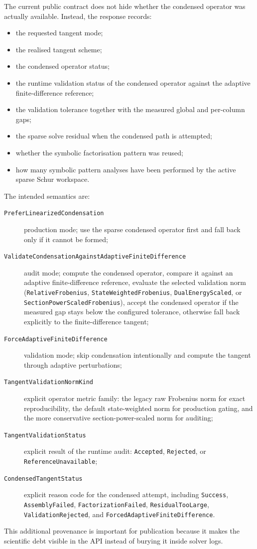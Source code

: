 The current public contract does not hide whether the condensed operator was
actually available.  Instead, the response records:
\begin{itemize}
  \item the requested tangent mode;
  \item the realised tangent scheme;
  \item the condensed operator status;
  \item the runtime validation status of the condensed operator against the
    adaptive finite-difference reference;
  \item the validation tolerance together with the measured global and
    per-column gaps;
  \item the sparse solve residual when the condensed path is attempted;
  \item whether the symbolic factorisation pattern was reused;
  \item how many symbolic pattern analyses have been performed by the active
    sparse Schur workspace.
\end{itemize}
The intended semantics are:
\begin{description}
  \item[\texttt{PreferLinearizedCondensation}] production mode; use the sparse
    condensed operator first and fall back only if it cannot be formed;
  \item[\texttt{ValidateCondensationAgainstAdaptiveFiniteDifference}] audit
    mode; compute the condensed operator, compare it against an adaptive
    finite-difference reference, evaluate the selected validation norm
    (\texttt{RelativeFrobenius}, \texttt{StateWeightedFrobenius},
    \texttt{DualEnergyScaled}, or
    \texttt{SectionPowerScaledFrobenius}), accept the condensed operator if the
    measured gap stays below the configured tolerance, otherwise fall back
    explicitly to the finite-difference tangent;
  \item[\texttt{ForceAdaptiveFiniteDifference}] validation mode; skip
    condensation intentionally and compute the tangent through adaptive
    perturbations;
  \item[\texttt{TangentValidationNormKind}] explicit operator metric family:
    the legacy raw Frobenius norm for exact reproducibility,
    the default state-weighted norm for production gating,
    and the more conservative section-power-scaled norm for auditing;
  \item[\texttt{TangentValidationStatus}] explicit result of the runtime audit:
    \texttt{Accepted}, \texttt{Rejected}, or
    \texttt{ReferenceUnavailable};
  \item[\texttt{CondensedTangentStatus}] explicit reason code for the
    condensed attempt, including \texttt{Success},
    \texttt{AssemblyFailed}, \texttt{FactorizationFailed},
    \texttt{ResidualTooLarge}, \texttt{ValidationRejected}, and
    \texttt{ForcedAdaptiveFiniteDifference}.
\end{description}
This additional provenance is important for publication because it makes the
scientific debt visible in the API instead of burying it inside solver logs.

